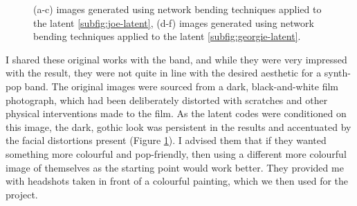 \begin{figure}[!htbp]
    \hfill
    \hfill
    \hfill
    \caption[Network bending applied to 0171 headshots]{(a-c) images generated using network bending techniques applied to the latent \ref{subfig:joe-latent}, (d-f) images generated using network bending techniques applied to the latent \ref{subfig:georgie-latent}.}
    \label{fig:c7:0171-haunted}
 \end{figure}

I shared these original works with the band, and while they were very impressed with the result, they were not quite in line with the desired aesthetic for a synth-pop band. 
The original images were sourced from a dark, black-and-white film photograph, which had been deliberately distorted with scratches and other physical interventions made to the film. 
As the latent codes were conditioned on this image, the dark, gothic look was persistent in the results and accentuated by the facial distortions present (Figure \ref{fig:c7:0171-haunted}). 
I advised them that if they wanted something more colourful and pop-friendly, then using a different more colourful image of themselves as the starting point would work better.
They provided me with headshots taken in front of a colourful painting, which we then used for the project. 

